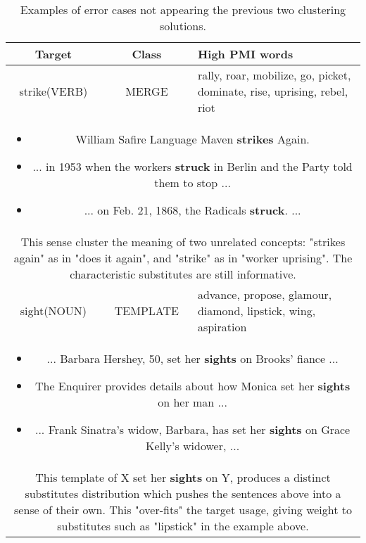 \documentclass[11pt,a4paper]{article}
\begin{document}
\begin{table*}[ht!]
\centering
\begin{tabularx}{\linewidth}{| c | c | X  |}
	\hline

	\textbf{Target} & \textbf{Class} & \textbf{High PMI words} \\ \hline \hline 
    strike(VERB) & MERGE & rally, roar, mobilize, go, picket, dominate, rise, uprising, rebel, riot \\ \hline
    \multicolumn{3}{|p{0.9\linewidth}|}{
    \begin{itemize}[topsep=0pt,itemsep=0pt,partopsep=0pt, parsep=0pt]
        \item William Safire Language Maven {\bf strikes} Again.
        \item ...  in 1953 when the workers {\bf struck} in Berlin and the Party told them to stop ...
        \item ...   on Feb. 21, 1868, the Radicals {\bf struck}. ...
    \end{itemize}
  } \\
  \multicolumn{3}{|p{0.9\linewidth}|}{
  This sense cluster the meaning of two unrelated concepts: "strikes again" as in "does it again", and "strike" as in "worker uprising". The characteristic substitutes are still informative.
  }\\
  \hline\hline
  sight(NOUN) & TEMPLATE &  advance, propose, glamour, diamond, lipstick, wing, aspiration \\ \hline
    \multicolumn{3}{|p{0.9\linewidth}|}{
    \begin{itemize}[topsep=0pt,itemsep=0pt,partopsep=0pt, parsep=0pt]
        \item ... Barbara Hershey, 50, set her {\bf sights} on Brooks' fiance ...
        \item The Enquirer provides details about how Monica set her {\bf sights} on her man ...
        \item ... Frank Sinatra's widow, Barbara, has set her {\bf sights} on Grace Kelly's widower, ...
    \end{itemize}
  }\\
  \multicolumn{3}{|p{0.9\linewidth}|}{
  This template of X set her {\bf sights} on Y, produces a distinct substitutes distribution which pushes the sentences above into a sense of their own. This "over-fits" the target usage, giving weight to substitutes such as "lipstick" in the example above.
  }\\
  \hline
\end{tabularx}
\caption{Examples of error cases not appearing the previous two clustering solutions.}
  \label{tab:qualrest}
\end{table*}
\end{document}
